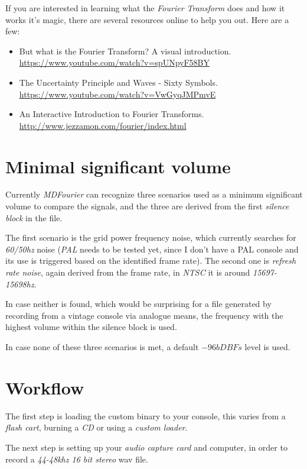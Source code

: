 \documentclass[10pt,a4paper]{report}
\begin{document}
If you are interested in learning what the \textit{Fourier Transform} does and how it works it's magic, there are several resources online to help you out. Here are a few:

\begin{itemize}
	\item But what is the Fourier Transform? A visual introduction.  \url{https://www.youtube.com/watch?v=spUNpyF58BY}
	\item The Uncertainty Principle and Waves - Sixty Symbols.  \url{https://www.youtube.com/watch?v=VwGyqJMPmvE}
	\item An Interactive Introduction to Fourier Transforms.  \url{http://www.jezzamon.com/fourier/index.html}
\end{itemize}


\section{Minimal significant volume}
\label{MinSigVolume}

Currently \textit{MDFourier} can recognize three scenarios used as a minimum significant volume to compare the signals, and the three are derived from the first \textit{silence block} in the file.

The first scenario is the grid power frequency noise, which currently searches for \textit{60/50hz} noise (\textit{PAL} needs to be tested yet, since I don't have a PAL console and its use is triggered based on the identified frame rate). The second one is \textit{refresh rate noise}, again derived from the frame rate, in \textit{NTSC} it is around \textit{15697-15698hz}. 

In case neither is found, which would be surprising for a file generated by recording from a vintage console via analogue means, the frequency with the highest volume within the silence block is used. 

In case none of these three scenarios is met, a default $-96bDBFs$ level is used.

\section{Workflow}

The first step is loading the custom binary to your console, this varies from a \textit{flash cart}, burning a \textit{CD} or using a \textit{custom loader}.

The next step is setting up your \textit{audio capture card} and computer, in order to record a \textit{44-48khz 16 bit stereo} wav file.
\end{document}
